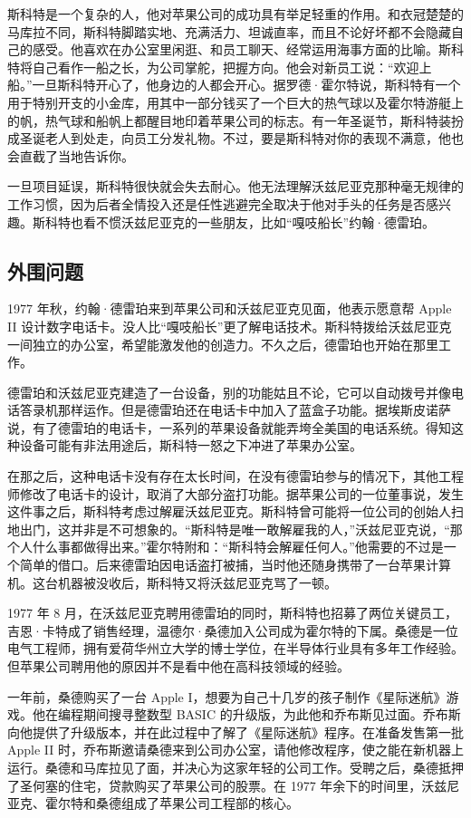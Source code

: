 \documentclass[12pt,UTF8]{ctexbook}
\begin{document}
斯科特是一个复杂的人，他对苹果公司的成功具有举足轻重的作用。和衣冠楚楚的马库拉不同，斯科特脚踏实地、充满活力、坦诚直率，而且不论好坏都不会隐藏自己的感受。他喜欢在办公室里闲逛、和员工聊天、经常运用海事方面的比喻。斯科特将自己看作一船之长，为公司掌舵，把握方向。他会对新员工说：“欢迎上船。”一旦斯科特开心了，他身边的人都会开心。据罗德·霍尔特说，斯科特有一个用于特别开支的小金库，用其中一部分钱买了一个巨大的热气球以及霍尔特游艇上的帆，热气球和船帆上都醒目地印着苹果公司的标志。有一年圣诞节，斯科特装扮成圣诞老人到处走，向员工分发礼物。不过，要是斯科特对你的表现不满意，他也会直截了当地告诉你。

一旦项目延误，斯科特很快就会失去耐心。他无法理解沃兹尼亚克那种毫无规律的工作习惯，因为后者全情投入还是任性逃避完全取决于他对手头的任务是否感兴趣。斯科特也看不惯沃兹尼亚克的一些朋友，比如“嘎吱船长”约翰·德雷珀。





\subsection{外围问题}


1977 年秋，约翰·德雷珀来到苹果公司和沃兹尼亚克见面，他表示愿意帮 Apple II 设计数字电话卡。没人比“嘎吱船长”更了解电话技术。斯科特拨给沃兹尼亚克一间独立的办公室，希望能激发他的创造力。不久之后，德雷珀也开始在那里工作。

德雷珀和沃兹尼亚克建造了一台设备，别的功能姑且不论，它可以自动拨号并像电话答录机那样运作。但是德雷珀还在电话卡中加入了蓝盒子功能。据埃斯皮诺萨说，有了德雷珀的电话卡，一系列的苹果设备就能弄垮全美国的电话系统。得知这种设备可能有非法用途后，斯科特一怒之下冲进了苹果办公室。

在那之后，这种电话卡没有存在太长时间，在没有德雷珀参与的情况下，其他工程师修改了电话卡的设计，取消了大部分盗打功能。据苹果公司的一位董事说，发生这件事之后，斯科特考虑过解雇沃兹尼亚克。斯科特曾可能将一位公司的创始人扫地出门，这并非是不可想象的。“斯科特是唯一敢解雇我的人，”沃兹尼亚克说，“那个人什么事都做得出来。”霍尔特附和：“斯科特会解雇任何人。”他需要的不过是一个简单的借口。后来德雷珀因电话盗打被捕，当时他还随身携带了一台苹果计算机。这台机器被没收后，斯科特又将沃兹尼亚克骂了一顿。

1977 年 8 月，在沃兹尼亚克聘用德雷珀的同时，斯科特也招募了两位关键员工，吉恩·卡特成了销售经理，温德尔·桑德加入公司成为霍尔特的下属。桑德是一位电气工程师，拥有爱荷华州立大学的博士学位，在半导体行业具有多年工作经验。但苹果公司聘用他的原因并不是看中他在高科技领域的经验。

一年前，桑德购买了一台 Apple I，想要为自己十几岁的孩子制作《星际迷航》游戏。他在编程期间搜寻整数型 BASIC 的升级版，为此他和乔布斯见过面。乔布斯向他提供了升级版本，并在此过程中了解了《星际迷航》程序。在准备发售第一批 Apple II 时，乔布斯邀请桑德来到公司办公室，请他修改程序，使之能在新机器上运行。桑德和马库拉见了面，并决心为这家年轻的公司工作。受聘之后，桑德抵押了圣何塞的住宅，贷款购买了苹果公司的股票。在 1977 年余下的时间里，沃兹尼亚克、霍尔特和桑德组成了苹果公司工程部的核心。
\end{document}
